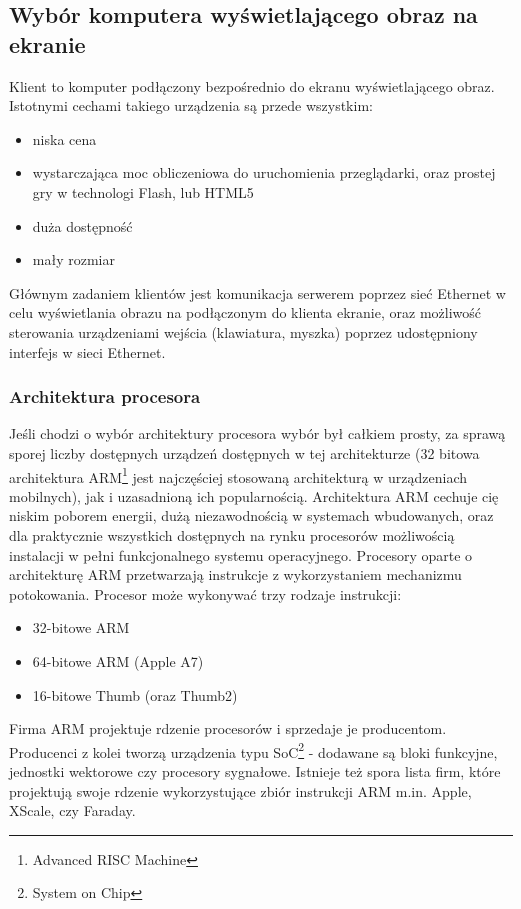 \subsection{Wybór komputera wyświetlającego obraz na ekranie}
\label{sec:Komputer wyświetlający obraz na ekranie}

Klient to komputer podłączony bezpośrednio do ekranu wyświetlającego obraz. Istotnymi cechami takiego urządzenia są przede wszystkim:
\begin{itemize}
	\item niska cena
	\item wystarczająca moc obliczeniowa do uruchomienia przeglądarki, oraz prostej gry w technologi Flash, lub HTML5
	\item duża dostępność
	\item mały rozmiar
\end{itemize}

Głównym zadaniem klientów jest komunikacja serwerem poprzez sieć Ethernet w celu wyświetlania obrazu na podłączonym do klienta ekranie, oraz możliwość sterowania urządzeniami wejścia (klawiatura, myszka) poprzez udostępniony interfejs w sieci Ethernet.

\subsubsection{Architektura procesora}

Jeśli chodzi o wybór architektury procesora wybór był całkiem prosty, za sprawą sporej liczby dostępnych urządzeń dostępnych w tej architekturze (32 bitowa architektura ARM\footnote{Advanced RISC Machine} jest najczęściej stosowaną architekturą w urządzeniach mobilnych\cite{acm}), jak i uzasadnioną ich popularnością. Architektura ARM cechuje cię niskim poborem energii, dużą niezawodnością w systemach wbudowanych, oraz dla praktycznie wszystkich dostępnych na rynku procesorów możliwością instalacji w pełni funkcjonalnego systemu operacyjnego.
Procesory oparte o architekturę ARM przetwarzają instrukcje z wykorzystaniem mechanizmu potokowania. Procesor może wykonywać trzy rodzaje instrukcji:
\begin{itemize}
	\item 32-bitowe ARM
	\item 64-bitowe ARM (Apple A7)
	\item 16-bitowe Thumb (oraz Thumb2)
\end{itemize}

\par
Firma ARM projektuje rdzenie procesorów i sprzedaje je producentom. Producenci z kolei tworzą urządzenia typu SoC\footnote{System on Chip} - dodawane są bloki funkcyjne, jednostki wektorowe czy procesory sygnałowe. Istnieje też spora lista firm, które projektują swoje rdzenie wykorzystujące zbiór instrukcji ARM m.in. Apple, XScale, czy Faraday.

